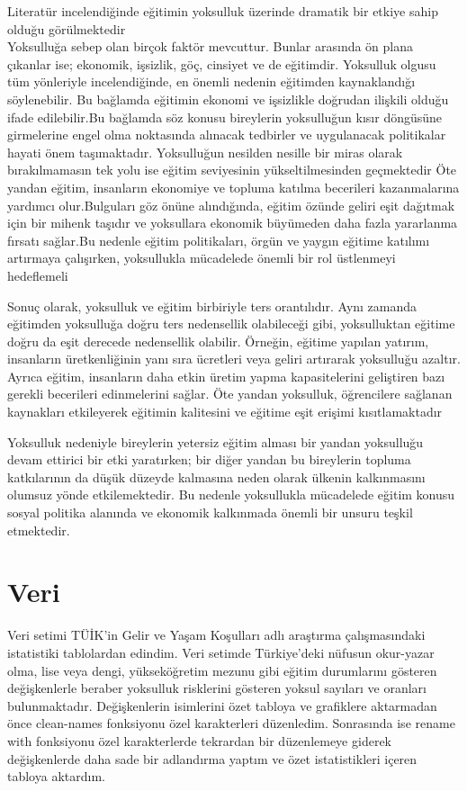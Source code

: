 \documentclass[
  12pt,
]{article}
\begin{document}
Literatür incelendiğinde eğitimin yoksulluk üzerinde dramatik bir etkiye sahip olduğu görülmektedir\\
Yoksulluğa sebep olan birçok faktör mevcuttur. Bunlar arasında ön plana çıkanlar ise; ekonomik, işsizlik, göç, cinsiyet ve de eğitimdir. Yoksulluk olgusu tüm yönleriyle incelendiğinde, en önemli nedenin eğitimden kaynaklandığı söylenebilir. Bu bağlamda eğitimin ekonomi ve işsizlikle doğrudan ilişkili olduğu ifade edilebilir.Bu bağlamda söz konusu bireylerin yoksulluğun kısır döngüsüne girmelerine engel olma noktasında alınacak tedbirler ve uygulanacak politikalar hayati önem taşımaktadır. Yoksulluğun nesilden nesille bir miras olarak bırakılmamasın tek yolu ise eğitim seviyesinin yükseltilmesinden geçmektedir
Öte yandan eğitim, insanların ekonomiye ve topluma katılma becerileri kazanmalarına yardımcı olur.Bulguları göz önüne alındığında, eğitim özünde geliri eşit dağıtmak için bir mihenk taşıdır ve yoksullara ekonomik büyümeden daha fazla yararlanma fırsatı sağlar.Bu nedenle eğitim politikaları, örgün ve yaygın eğitime katılımı artırmaya çalışırken, yoksullukla mücadelede önemli bir rol üstlenmeyi hedeflemeli

Sonuç olarak, yoksulluk ve eğitim birbiriyle ters orantılıdır.
Aynı zamanda eğitimden yoksulluğa doğru ters nedensellik olabileceği gibi, yoksulluktan eğitime doğru da eşit derecede nedensellik olabilir. Örneğin, eğitime yapılan yatırım, insanların üretkenliğinin yanı sıra ücretleri veya geliri artırarak yoksulluğu azaltır. Ayrıca eğitim, insanların daha etkin üretim yapma kapasitelerini geliştiren bazı gerekli becerileri edinmelerini sağlar. Öte yandan yoksulluk, öğrencilere sağlanan kaynakları etkileyerek eğitimin kalitesini ve eğitime eşit erişimi kısıtlamaktadır

Yoksulluk nedeniyle bireylerin yetersiz eğitim alması bir yandan yoksulluğu devam ettirici bir etki yaratırken; bir diğer yandan bu bireylerin topluma katkılarının da düşük düzeyde kalmasına neden olarak ülkenin kalkınmasını olumsuz yönde etkilemektedir. Bu nedenle yoksullukla mücadelede eğitim konusu sosyal politika alanında ve ekonomik kalkınmada önemli bir unsuru teşkil etmektedir.

\hypertarget{veri}{%
\section{Veri}\label{veri}}

Veri setimi TÜİK'in Gelir ve Yaşam Koşulları adlı araştırma çalışmasındaki istatistiki tablolardan edindim. Veri setimde Türkiye'deki nüfusun okur-yazar olma, lise veya dengi, yükseköğretim mezunu gibi eğitim durumlarını gösteren değişkenlerle beraber yoksulluk risklerini gösteren yoksul sayıları ve oranları bulunmaktadır. Değişkenlerin isimlerini özet tabloya ve grafiklere aktarmadan önce clean-names fonksiyonu özel karakterleri düzenledim. Sonrasında ise rename with fonksiyonu özel karakterlerde tekrardan bir düzenlemeye giderek değişkenlerde daha sade bir adlandırma yaptım ve özet istatistikleri içeren tabloya aktardım.
\end{document}
